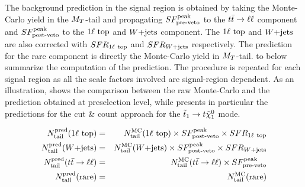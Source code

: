         The background prediction in the signal region is obtained by taking the Monte-Carlo
        yield in the $M_T$-tail and propagating $SF_{\text{pre-veto}}^{\text{peak}}$ to the $t\bar{t} \rightarrow \ell \ell$ component and $SF_{\text{post-veto}}^{\text{peak}}$
        to the $1\ell~\text{top}$ and $\text{$W$+jets}$ component. The $1\ell~\text{top}$ and $\text{$W$+jets}$
        are also corrected with $SFR_{1\ell~\text{top}}$ and $SFR_{\text{$W$+jets}}$ respectively. The
        prediction for the rare component is directly the Monte-Carlo yield in $M_T$-tail.
         to  below summarize
        the computation of the prediction. The procedure is repeated for each signal
        region as all the scale factors involved are signal-region dependent. As an
        illustration, 
        shows the comparison between the raw Monte-Carlo and the prediction obtained at
        preselection level, while  presents in particular
        the predictions for the cut \& count approach for the
        $\tilde{t}_1 \rightarrow t \tilde{\chi}_1^0$ mode.

        \begin{eqnarray}
            N^\text{pred}_\text{tail}(1\ell~\text{top}) & = & N^\text{MC}_\text{tail}(1\ell~\text{top})  \times SF_{\text{post-veto}}^{\text{peak}} \times SFR_{1\ell~\text{top}} \label{eq:prediction1ltop}  \\
            N^\text{pred}_\text{tail}(\text{$W$+jets})        & = & N^\text{MC}_\text{tail}(\text{$W$+jets})         \times SF_{\text{post-veto}}^{\text{peak}}  \times SFR_{\text{$W$+jets}}                             \\
            N^\text{pred}_\text{tail}(t\bar{t} \rightarrow \ell \ell)  & = & N^\text{MC}_\text{tail}(t\bar{t} \rightarrow \ell \ell)   \times SF_{\text{pre-veto}}^{\text{peak}}                                                \\
            N^\text{pred}_\text{tail}(\text{rare})   & = & N^\text{MC}_\text{tail}(\text{rare})                                           \label{eq:predictionrare}
        \end{eqnarray}

